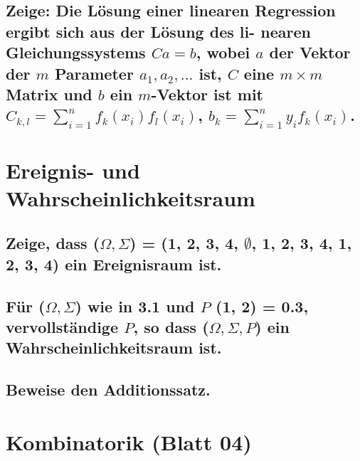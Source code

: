\documentclass[a4paper,10pt]{article}
\begin{document}
\subsection{Zeige: Die Lösung einer linearen Regression ergibt sich aus der Lösung des li-
nearen Gleichungssystems $C a = b$, wobei $a$ der Vektor der $m$ Parameter $a_1 , a_2 , . . .$
ist, $C$ eine $m × m$ Matrix und $b$ ein $m$-Vektor ist mit\newline
$C_{k,l}=\sum\limits_{i=1}^n f_k (x_i)f_l (x_i)$, $b_k = \sum\limits_{i=1}^n y_i f_k (x_i)$.}

\newpage
\section{Ereignis- und Wahrscheinlichkeitsraum}
\subsection{Zeige, dass ($\Omega, \Sigma$) = ({1, 2, 3, 4}, {$\emptyset$, {1, 2}, {3, 4}, {1, 2, 3, 4}}) ein Ereignisraum ist.}

\subsection{Für ($\Omega, \Sigma$) wie in 3.1 und $P$ ({1, 2}) = 0.3, vervollständige $P$, so dass ($\Omega, \Sigma, P$) ein Wahrscheinlichkeitsraum ist.}

\subsection{Beweise den Additionssatz.}

\newpage
\section{Kombinatorik (Blatt 04)} %
\subsection{}

\subsection{}
\end{document}
